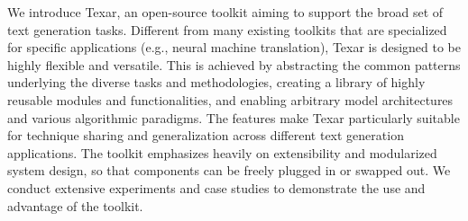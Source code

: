 We introduce Texar, an open-source toolkit aiming to support the broad set of text generation tasks. Different from many existing toolkits that are specialized for specific applications (e.g., neural machine translation), Texar is designed to be highly flexible and versatile. This is achieved by abstracting the common patterns underlying the diverse tasks and methodologies, creating a library of highly reusable modules and functionalities, and enabling arbitrary model architectures and various algorithmic paradigms. The features make Texar particularly suitable for technique sharing and generalization across different text generation applications. The toolkit emphasizes heavily on extensibility and modularized system design, so that components can be freely plugged in or swapped out. We conduct extensive experiments and case studies to demonstrate the use and advantage of the toolkit.
